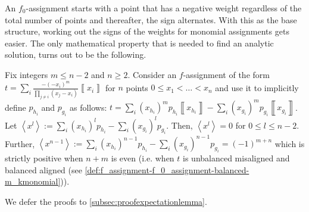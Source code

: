 \documentclass{theoretics}
\begin{document}
An $f_{0}$-assignment starts with a
point that has a negative weight regardless of the total number of points and thereafter, the sign alternates. With
this as the base structure, working out the signs of the weights for
monomial assignments gets easier. %
The only mathematical
property that is needed to find an analytic
solution, turns out to be the following.
\begin{lemma}
  Fix integers $m\le n-2$ and $n\ge2$. Consider an $f$-assignment of
  the form $t=\sum_{i}\frac{-(-x_{i})^{m}}{\prod_{j\neq i}(x_{j}-x_{i})}\left\llbracket x_{i}\right\rrbracket $
  for $n$ points $0\le x_{1} < \dots <x_{n}$ and use it to implicitly
  define $p_{h_{i}}$ and $p_{g_{i}}$ as follows: $t=\sum_{i}(x_{h_{i}})^{m}p_{h_{i}}\left\llbracket x_{h_{i}}\right\rrbracket -\sum_{i}(x_{g_{i}})^{m}p_{g_{i}}\left\llbracket x_{g_{i}}\right\rrbracket $.
  Let $\left\langle x^{l}\right\rangle :=\sum_{i}(x_{h_{i}})^{l}p_{h_{i}}-\sum_{i}(x_{g_{i}})^{l}p_{g_{i}}$. Then, $\left\langle x^{l}\right\rangle =0$ for $0\le l\le n-2$.
  Further, $\left\langle x^{n-1}\right\rangle :=\sum_{i}(x_{h_{i}})^{n-1}p_{h_{i}}-\sum_{i}(x_{g_{i}})^{n-1}p_{g_{i}}=(-1)^{m+n}$
  which is strictly positive when $n+m$ is even (i.e. when
  $t$ is unbalanced misaligned and balanced aligned (see \cref{def:f_assignment-f_0_assignment-balanced-m_kmonomial})).

  \label{lem:expectationLemma}
\end{lemma}
We defer the proofs to \cref{subsec:proofexpectationlemma}.
\end{document}
